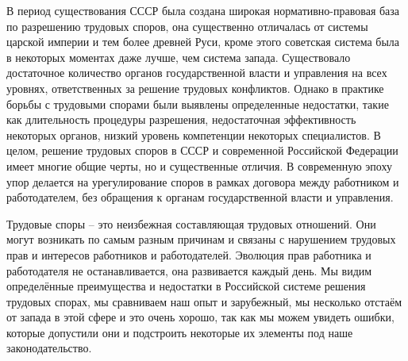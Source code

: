 В период существования СССР была создана широкая нормативно-правовая база по разрешению трудовых споров, она существенно отличалась от системы царской империи и тем более древней Руси, кроме этого советская система была в некоторых моментах даже лучше, чем система запада.  Существовало достаточное количество органов государственной власти и управления на всех уровнях, ответственных за решение трудовых конфликтов. Однако в практике борьбы с трудовыми спорами были выявлены определенные недостатки, такие как длительность процедуры разрешения, недостаточная эффективность некоторых органов, низкий уровень компетенции некоторых специалистов. В целом, решение трудовых споров в СССР и современной Российской Федерации имеет многие общие черты, но и существенные отличия. В современную эпоху упор делается на урегулирование споров в рамках договора между работником и работодателем, без обращения к органам государственной власти и управления.

\newpage
\conclusion

Трудовые споры – это неизбежная составляющая трудовых отношений. Они могут возникать по самым разным причинам и связаны с нарушением трудовых прав и интересов работников и работодателей. Эволюция прав работника и работодателя не останавливается, она развивается каждый день. Мы видим определённые преимущества и недостатки в Российской системе решения трудовых спорах, мы сравниваем наш опыт и зарубежный, мы несколько отстаём от запада в этой сфере и это очень хорошо, так как мы можем увидеть ошибки, которые допустили они и подстроить некоторые их элементы под наше законодательство. 

